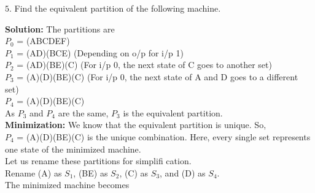 \documentclass[12pt,a4paper]{book}
\begin{document}
$5.$ Find the equivalent partition of the following machine.
\begin{center}
\begin{table}[h]
\centering
{}
\end{table}
\end{center}
\textbf{Solution:}  The partitions are\\
$P_0$ = (ABCDEF)\\
$P_1$ = (AD)(BCE) (Depending on o/p for i/p 1)\\
$P_2$ = (AD)(BE)(C) (For i/p 0, the next state of C goes to another set)\\
$P_3$ = (A)(D)(BE)(C) (For i/p 0, the next state of A and D goes to a different set)\\
$P_4$ = (A)(D)(BE)(C)\\
As $P_3$ and $P_4$ are the same, $P_3$ is the equivalent partition.\\
\textbf{ Minimization:} We know that the equivalent partition is unique. So,\\ $P_4$ = (A)(D)(BE)(C) is the
unique combination. Here, every single set represents one state of the minimized machine.\\
Let us rename these partitions for simplifi cation.\\
Rename (A) as $S_1$, (BE) as $S_2$, (C) as $S_3$, and (D) as $S_4$.\\
The minimized machine becomes
\begin{center}
\begin{table}[h]
\centering
{}
\end{table}
\end{center}
\end{document}
